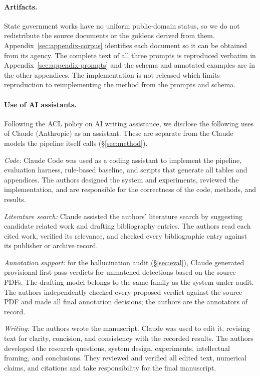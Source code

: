 \documentclass[11pt]{article}
\begin{document}
\paragraph{Artifacts.} State government works have no uniform public-domain
status, so we do not redistribute the source documents or the goldens derived from them. Appendix~\ref{sec:appendix-corpus} identifies each document so it can
be obtained from its agency. The complete text of all three prompts is
reproduced verbatim in Appendix~\ref{sec:appendix-prompts} and the schema and
annotated examples are in the other appendices. The implementation is not
released which limits reproduction to reimplementing the method from the
prompts and schema.

\paragraph{Use of AI assistants.} Following the ACL policy on AI writing
assistance, we disclose the following uses of Claude (Anthropic) as an
assistant. These are separate from the Claude models the pipeline itself calls
(\S\ref{sec:method}).

\emph{Code:} Claude Code was used as a coding assistant to implement the pipeline, evaluation harness, rule-based baseline, and scripts that generate all tables and appendices. The authors designed the system and experiments, reviewed the implementation, and are responsible for the correctness of the code, methods, and results.

\emph{Literature search:} Claude assisted the authors' literature search by suggesting candidate related work and drafting bibliography entries. The authors read each cited work, verified its relevance, and checked every bibliographic entry against its publisher or archive record.

\emph{Annotation support:} for the hallucination audit (\S\ref{sec:eval}), Claude generated provisional first-pass verdicts for unmatched detections based on the source PDFs. The drafting model belongs to the same family as the system under audit. The authors independently checked every proposed verdict against the source PDF and made all final annotation decisions; the authors are the annotators of record.

\emph{Writing:} The authors wrote the manuscript. Claude was used to edit it, revising text for clarity, concision, and consistency with the recorded results. The authors developed the research questions, system design, experiments, intellectual framing, and conclusions. They reviewed and verified all edited text, numerical claims, and citations and take responsibility for the final manuscript.
\end{document}
